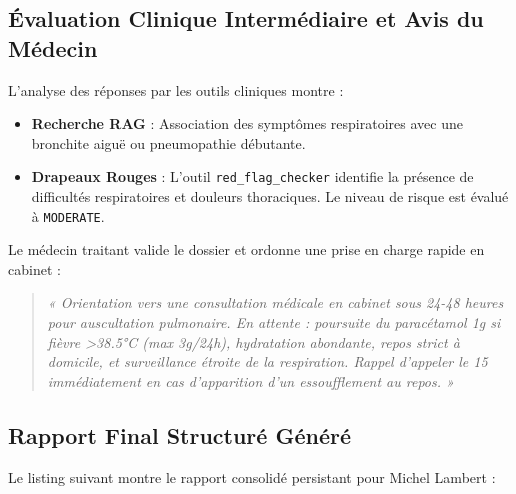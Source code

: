 \documentclass[11pt,a4paper]{report}
\begin{document}
\subsection{Évaluation Clinique Intermédiaire et Avis du Médecin}
L'analyse des réponses par les outils cliniques montre :
\begin{itemize}
    \item \textbf{Recherche RAG} : Association des symptômes respiratoires avec une bronchite aiguë ou pneumopathie débutante.
    \item \textbf{Drapeaux Rouges} : L'outil \texttt{red\_flag\_checker} identifie la présence de difficultés respiratoires et douleurs thoraciques. Le niveau de risque est évalué à \texttt{MODERATE}.
\end{itemize}
Le médecin traitant valide le dossier et ordonne une prise en charge rapide en cabinet :
\begin{quote}
    \textit{« Orientation vers une consultation médicale en cabinet sous 24-48 heures pour auscultation pulmonaire. En attente : poursuite du paracétamol 1g si fièvre >38.5°C (max 3g/24h), hydratation abondante, repos strict à domicile, et surveillance étroite de la respiration. Rappel d'appeler le 15 immédiatement en cas d'apparition d'un essoufflement au repos. »}
\end{quote}

\subsection{Rapport Final Structuré Généré}
Le listing suivant montre le rapport consolidé persistant pour Michel Lambert :
\end{document}
